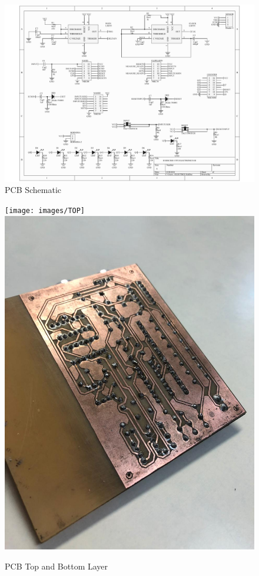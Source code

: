 \begin{figure}[H]
\begin{centering}
\includegraphics[scale=0.6]{Schematic}
\par\end{centering}
\caption{PCB Schematic}

\end{figure}

\begin{figure}[H]
\begin{centering}
\texttt{[image: images/TOP]} \includegraphics[scale=0.16]{images/BOT}
\par\end{centering}
\caption{PCB Top and Bottom Layer}

\end{figure}

